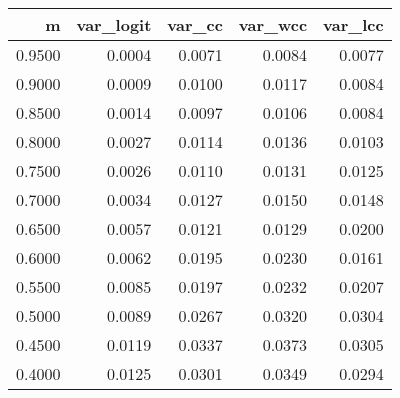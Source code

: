 \begin{table}[ht]
\centering
\begin{tabular}{rrrrr}
  \hline
m & var\_logit & var\_cc & var\_wcc & var\_lcc \\ 
  \hline
0.9500 & 0.0004 & 0.0071 & 0.0084 & 0.0077 \\ 
  0.9000 & 0.0009 & 0.0100 & 0.0117 & 0.0084 \\ 
  0.8500 & 0.0014 & 0.0097 & 0.0106 & 0.0084 \\ 
  0.8000 & 0.0027 & 0.0114 & 0.0136 & 0.0103 \\ 
  0.7500 & 0.0026 & 0.0110 & 0.0131 & 0.0125 \\ 
  0.7000 & 0.0034 & 0.0127 & 0.0150 & 0.0148 \\ 
  0.6500 & 0.0057 & 0.0121 & 0.0129 & 0.0200 \\ 
  0.6000 & 0.0062 & 0.0195 & 0.0230 & 0.0161 \\ 
  0.5500 & 0.0085 & 0.0197 & 0.0232 & 0.0207 \\ 
  0.5000 & 0.0089 & 0.0267 & 0.0320 & 0.0304 \\ 
  0.4500 & 0.0119 & 0.0337 & 0.0373 & 0.0305 \\ 
  0.4000 & 0.0125 & 0.0301 & 0.0349 & 0.0294 \\ 
   \hline
\end{tabular}
\end{table}
